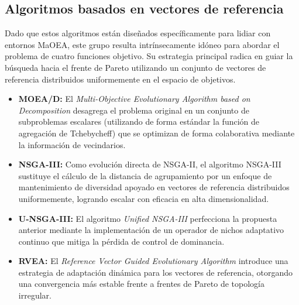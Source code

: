 \subsection{Algoritmos basados en vectores de referencia}
Dado que estos algoritmos están diseñados específicamente para lidiar con entornos MaOEA, este grupo resulta intrínsecamente idóneo para abordar el problema de cuatro funciones objetivo. Su estrategia principal radica en guiar la búsqueda hacia el frente de Pareto utilizando un conjunto de vectores de referencia distribuidos uniformemente en el espacio de objetivos.
\begin{itemize}
    \item \textbf{MOEA/D:} El \textit{Multi-Objective Evolutionary Algorithm based on Decomposition} \cite{zhang2007moea} desagrega el problema original en un conjunto de subproblemas escalares (utilizando de forma estándar la función de agregación de Tchebycheff) que se optimizan de forma colaborativa mediante la información de vecindarios.
    \item \textbf{NSGA-III:} Como evolución directa de NSGA-II, el algoritmo NSGA-III \cite{deb2013evolutionary} sustituye el cálculo de la distancia de agrupamiento por un enfoque de mantenimiento de diversidad apoyado en vectores de referencia distribuidos uniformemente, logrando escalar con eficacia en alta dimensionalidad.
    \item \textbf{U-NSGA-III:} El algoritmo \textit{Unified NSGA-III} \cite{seada2015unified} perfecciona la propuesta anterior mediante la implementación de un operador de nichos adaptativo continuo que mitiga la pérdida de control de dominancia.
    \item \textbf{RVEA:} El \textit{Reference Vector Guided Evolutionary Algorithm} \cite{cheng2016reference} introduce una estrategia de adaptación dinámica para los vectores de referencia, otorgando una convergencia más estable frente a frentes de Pareto de topología irregular.
\end{itemize}


